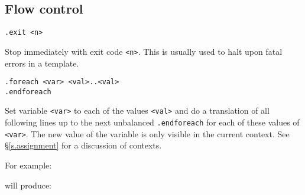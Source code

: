 \subsection{Flow control}
\begin{verbatim}
.exit <n>
\end{verbatim}
\begin{desc}
Stop {\Tm} immediately with exit code \texttt{<n>}.
This is usually used to halt upon fatal errors in a template.
\end{desc}
\begin{verbatim}
.foreach <var> <val>..<val>
.endforeach
\end{verbatim}
\begin{desc}
Set variable \texttt{<var>} to each of the values \texttt{<val>} and do a
translation of all following lines up to the next unbalanced
\texttt{.endforeach} for each of these values of \texttt{<var>}.
The new value of the variable is only visible in the current context.
See \S\ref{s.assignment} for a discussion of contexts.

For example:
\begin{showfile}

\end{showfile}
will produce:
\begin{showfile}

\end{showfile}
\end{desc}

